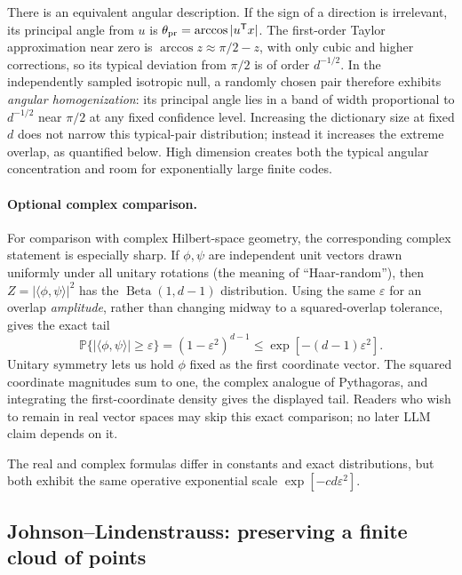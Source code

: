 \documentclass[
  aps,
  reprint,
  superscriptaddress,
  floatfix,
  nofootinbib,
  longbibliography
]{revtex4-2}
\newcommand{\Prob}{\mathbb{P}}
\newcommand{\T}{^{\mathsf{T}}}
\begin{document}
There is an equivalent angular description.  If the sign of a direction is
irrelevant, its principal angle from $u$ is
$\theta_{\rm pr}=\arccos|u\T x|$.  The first-order Taylor approximation near
zero is $\arccos z\approx\pi/2-z$, with only cubic and higher corrections, so its typical deviation from $\pi/2$ is of
order $d^{-1/2}$.  In the independently sampled isotropic null, a randomly
chosen pair therefore
exhibits \emph{angular homogenization}: its principal angle lies in a band of
width proportional to $d^{-1/2}$ near $\pi/2$ at any fixed confidence level.
Increasing the dictionary size at
fixed $d$ does not narrow this typical-pair distribution; instead it increases
the extreme overlap, as quantified below.  High dimension creates both the
typical angular concentration and room for exponentially large finite codes.

\paragraph{Optional complex comparison.}
For comparison with complex Hilbert-space geometry, the corresponding complex
statement is especially sharp.  If $\phi,\psi$ are independent unit vectors
drawn uniformly under all unitary rotations (the meaning of ``Haar-random''), then
$Z=|\langle\phi,\psi\rangle|^2$ has the
$\operatorname{Beta}(1,d-1)$ distribution.  Using the same
$\varepsilon$ for an overlap \emph{amplitude}, rather than changing midway to
a squared-overlap tolerance, gives the exact tail
\begin{equation}
\label{eq:complex-haar-tail}
\Prob\{|\langle\phi,\psi\rangle|\geq\varepsilon\}
=(1-\varepsilon^2)^{d-1}
\leq
\exp[-(d-1)\varepsilon^2].
\end{equation}
Unitary symmetry lets us hold $\phi$ fixed as the first coordinate vector.
The squared coordinate magnitudes sum to one, the complex analogue of
Pythagoras, and integrating the first-coordinate density gives the displayed
tail.  Readers who wish to remain in real vector spaces may skip this exact
comparison; no later LLM claim depends on it.

The real and complex formulas differ in constants and exact distributions,
but both exhibit the same operative exponential scale
$\exp[-c d\varepsilon^2]$.

\subsection{Johnson--Lindenstrauss: preserving a finite cloud of points}
\label{sec:jl}
\end{document}

